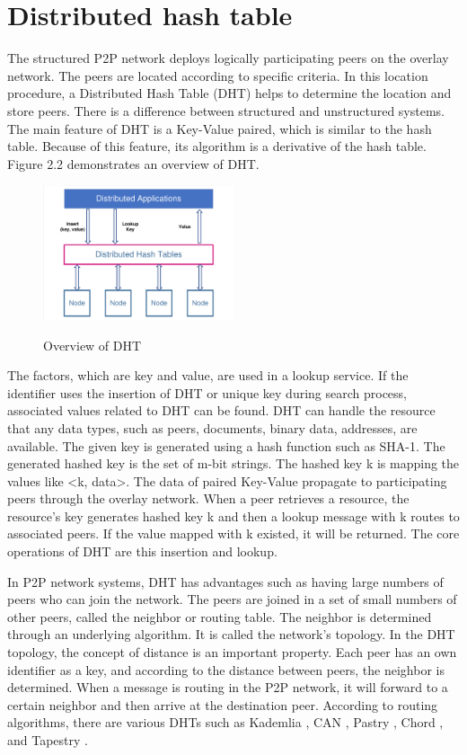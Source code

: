 \section{Distributed hash table}

The structured P2P network deploys logically participating peers on the overlay network. The peers are located according to specific criteria. In this location procedure, a Distributed Hash Table (DHT) helps to determine the location and store peers. There is a difference between structured and unstructured systems. The main feature of DHT is a Key-Value paired, which is similar to the hash table. Because of this feature, its algorithm is a derivative of the hash table. Figure 2.2 demonstrates an overview of DHT. 

\begin{figure}[!ht]
	\centering
	\includegraphics[width=0.5\textwidth]{images/fig_2_2.pdf}\\
	\caption{Overview of DHT}
	\label{fig:DHT}
\end{figure}

The factors, which are key and value, are used in a lookup service. If the identifier uses the insertion of DHT or unique key during search process, associated values related to DHT can be found.  DHT can handle the resource that any data types, such as peers, documents, binary data, addresses, are available. The given key is generated using a hash function such  as SHA-1. The generated hashed key is the set of m-bit strings. The hashed key k is mapping the values like <k, data>. The data of paired Key-Value propagate to participating peers through the overlay network. When a peer retrieves a resource, the resource's key generates hashed key k and then a lookup message with k routes to associated peers. If the value mapped with k existed, it will be returned. The core operations of DHT are this insertion and lookup. 

In P2P network systems, DHT has advantages such as having large numbers of peers who can join the network. The peers are joined in a set of small numbers of other peers, called the neighbor or routing table. The neighbor is determined through an underlying algorithm. It is called the network’s topology. In the DHT topology, the concept of distance is an important property. Each peer has an own identifier as a key, and according to the distance between peers, the neighbor is determined. When a message is routing in the P2P network, it will forward to a certain neighbor and then arrive at the destination peer. According to routing algorithms, there are various DHTs such as Kademlia \cite{druschel2003peer}, CAN \cite{ratnasamy2002routing}, Pastry \cite{rowstron2001pastry}, Chord \cite{stoica2001chord}, and Tapestry \cite{zhao2001tapestry}.



